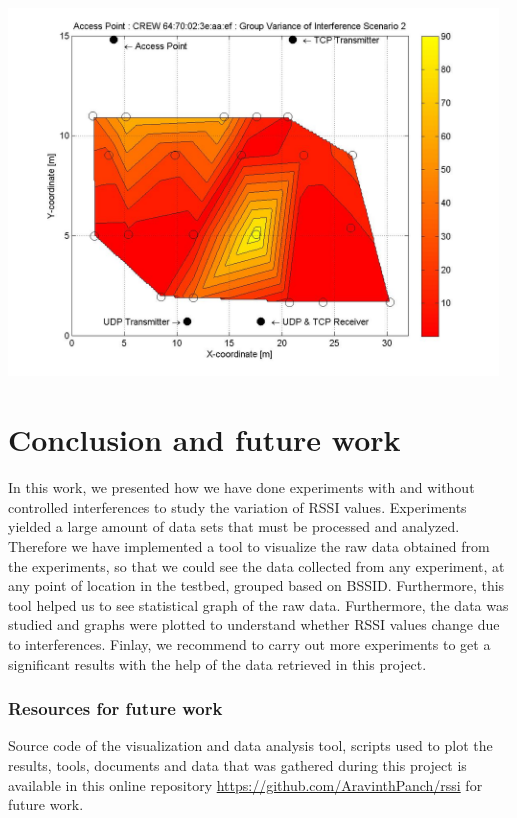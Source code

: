 \documentclass[11pt,a4paper,headinclude,footinclude,chapterprefix=on]{scrreprt}
\begin{document}
\begin{longtable}
	\includegraphics[width=13cm]{../../Source/plot/CREW_ef/ef_Wifi_Group_Variance.jpg} \\
\end{longtable}

\chapter{Conclusion and future work} In this work, we presented how we have done experiments with and without controlled interferences to study the variation of RSSI values. Experiments yielded a large amount of data sets that must be processed and analyzed. Therefore we have implemented a tool to visualize the raw data obtained from the experiments, so that we could see the data collected from any experiment, at any point of location in the testbed, grouped based on BSSID. Furthermore, this tool helped us to see statistical graph of the raw data. Furthermore, the data was studied and graphs were plotted to understand whether RSSI values change due to interferences. Finlay, we recommend to carry out more experiments to get a significant results with the help of the data retrieved in this project. 

\subsection*{Resources for future work}
Source code of the visualization and data analysis tool, scripts used to plot the results, tools, documents and data that was gathered during this project is available in this online repository \url{https://github.com/AravinthPanch/rssi} for future work. 
\end{document}

